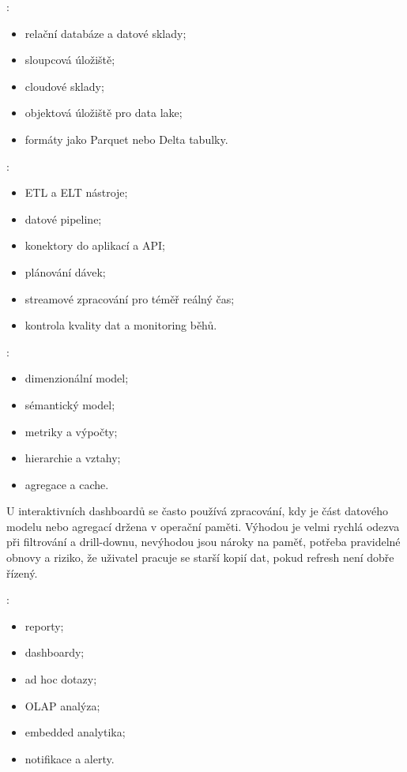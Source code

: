 :
\begin{itemize}
  \item relační databáze a datové sklady;
  \item sloupcová úložiště;
  \item cloudové sklady;
  \item objektová úložiště pro data lake;
  \item formáty jako Parquet nebo Delta tabulky.
\end{itemize}

:
\begin{itemize}
  \item ETL a ELT nástroje;
  \item datové pipeline;
  \item konektory do aplikací a API;
  \item plánování dávek;
  \item streamové zpracování pro téměř reálný čas;
  \item kontrola kvality dat a monitoring běhů.
\end{itemize}

:
\begin{itemize}
  \item dimenzionální model;
  \item sémantický model;
  \item metriky a výpočty;
  \item hierarchie a vztahy;
  \item agregace a cache.
\end{itemize}

U interaktivních dashboardů se často používá  zpracování, kdy je část datového modelu
nebo agregací držena v operační paměti. Výhodou je velmi rychlá odezva při filtrování a drill-downu,
nevýhodou jsou nároky na paměť, potřeba pravidelné obnovy a riziko, že uživatel pracuje se starší
kopií dat, pokud refresh není dobře řízený.

:
\begin{itemize}
  \item reporty;
  \item dashboardy;
  \item ad hoc dotazy;
  \item OLAP analýza;
  \item embedded analytika;
  \item notifikace a alerty.
\end{itemize}

